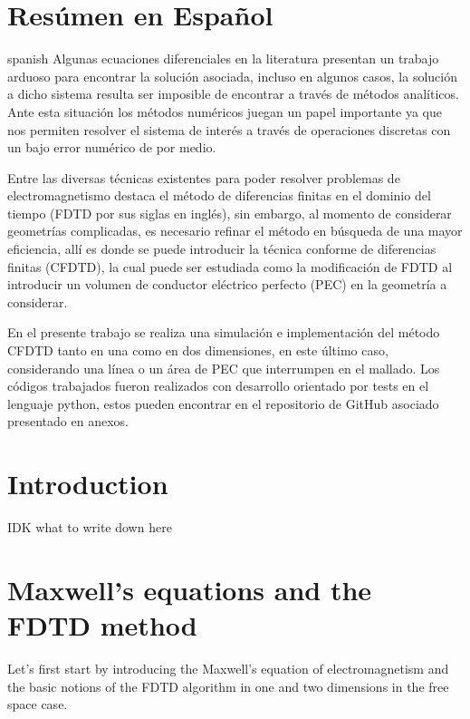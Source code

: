 \documentclass[12pt, oneside]{book}
\begin{document}
\chapter*{Resúmen en Español}

\begin{otherlanguage*}{spanish}
    \indent Algunas ecuaciones diferenciales en la literatura presentan un trabajo arduoso para encontrar la solución asociada, incluso en algunos casos, la solución a dicho sistema resulta ser imposible de encontrar a través de métodos analíticos. Ante esta situación los métodos numéricos juegan un papel importante ya que nos permiten resolver el sistema de interés a través de operaciones discretas con un bajo error numérico de por medio. 

    \indent Entre las diversas técnicas existentes para poder resolver problemas de electromagnetismo destaca el método de diferencias finitas en el dominio del tiempo (FDTD por sus siglas en inglés), sin embargo, al momento de considerar geometrías complicadas, es necesario refinar el método en búsqueda de una mayor eficiencia, allí es donde se puede introducir la técnica conforme de diferencias finitas (CFDTD), la cual puede ser estudiada como la modificación de FDTD al introducir un volumen de conductor eléctrico perfecto (PEC) en la geometría a considerar.

    \indent En el presente trabajo se realiza una simulación e implementación del método CFDTD tanto en una como en dos dimensiones, en este último caso, considerando una línea o un área de PEC que interrumpen en el mallado. Los códigos trabajados fueron realizados con desarrollo orientado por tests en el lenguaje python, estos pueden encontrar en el repositorio de GitHub asociado presentado en anexos.
\end{otherlanguage*}

\chapter{Introduction}

IDK what to write down here

\chapter{Maxwell's equations and the FDTD method}

Let's first start by introducing the Maxwell's equation of electromagnetism and the basic notions of the FDTD algorithm in one and two dimensions in the free space case.
\end{document}
